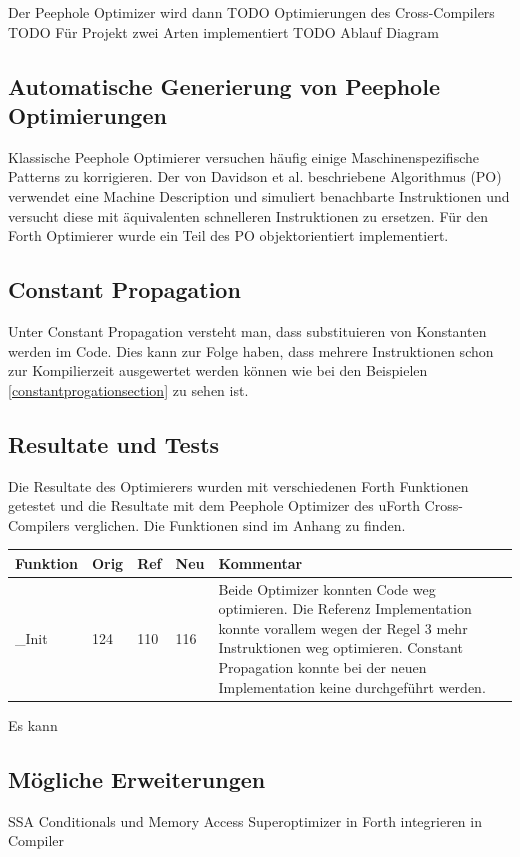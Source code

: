 Der Peephole Optimizer wird dann 
TODO Optimierungen des Cross-Compilers
TODO Für Projekt zwei Arten implementiert
TODO Ablauf Diagram

\subsection{Automatische Generierung von Peephole Optimierungen}

Klassische Peephole Optimierer versuchen häufig einige Maschinenspezifische Patterns zu korrigieren. Der von Davidson et al. beschriebene Algorithmus (PO) verwendet eine Machine Description und simuliert  benachbarte Instruktionen und versucht diese mit äquivalenten schnelleren Instruktionen zu ersetzen. Für den Forth Optimierer wurde ein Teil des PO objektorientiert implementiert.

\subsection{Constant Propagation}
Unter Constant Propagation versteht man, dass substituieren von Konstanten werden im Code. Dies kann zur Folge haben, dass mehrere Instruktionen schon zur Kompilierzeit ausgewertet werden können wie bei den Beispielen \ref{constantprogationsection} zu sehen ist.

\subsection{Resultate und Tests}
Die Resultate des Optimierers wurden mit verschiedenen Forth Funktionen getestet und die Resultate mit dem Peephole Optimizer des uForth Cross-Compilers verglichen. Die Funktionen sind im Anhang zu finden.

\begin{center}
    \begin{tabular}{ | l | l | l | l | p{8cm} |}
    \hline
    \textbf{Funktion} & \textbf{Orig} & \textbf{Ref} & \textbf{Neu} & \textbf{Kommentar} \\ \hline
    \_Init & 124 & 110 & 116 & Beide Optimizer konnten Code weg optimieren. Die Referenz Implementation konnte vorallem wegen der Regel 3 mehr Instruktionen weg optimieren. Constant Propagation konnte bei der neuen Implementation keine durchgeführt werden.  \\ 
    \hline
    \end{tabular}
\end{center}

Es kann

\subsection{Mögliche Erweiterungen}
SSA
Conditionals und Memory Access
Superoptimizer
in Forth
integrieren in Compiler